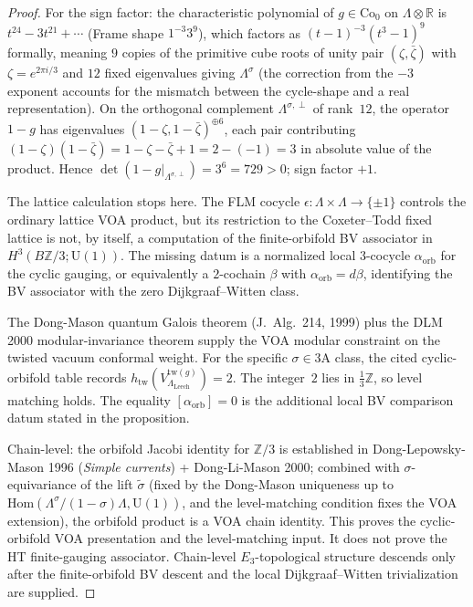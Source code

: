 \begin{proof}
For the sign factor: the characteristic polynomial of
$g \in \mathrm{Co}_0$ on $\Lambda \otimes \mathbb{R}$ is
$t^{24} - 3 t^{21} + \cdots$ (Frame shape $1^{-3} 3^9$), which
factors as $(t - 1)^{-3}(t^3 - 1)^9$ formally, meaning $9$ copies of
the primitive cube roots of unity pair $(\zeta, \bar\zeta)$ with
$\zeta = e^{2\pi i/3}$ and $12$ fixed eigenvalues giving $\Lambda^\sigma$
(the correction from the $-3$ exponent accounts for the mismatch
between the cycle-shape and a real representation). On the orthogonal
complement $\Lambda^{\sigma,\perp}$ of rank~$12$, the operator $1 - g$
has eigenvalues $(1 - \zeta, 1 - \bar\zeta)^{\oplus 6}$, each pair
contributing $(1-\zeta)(1-\bar\zeta) = 1 - \zeta - \bar\zeta + 1
= 2 - (-1) = 3$ in absolute value of the product. Hence
$\det(1 - g|_{\Lambda^{\sigma,\perp}}) = 3^6 = 729 > 0$; sign factor
$+1$.

The lattice calculation stops here.  The FLM cocycle
\(\epsilon\colon \Lambda\times\Lambda\to\{\pm1\}\) controls the
ordinary lattice VOA product, but its restriction to the
Coxeter--Todd fixed lattice is not, by itself, a computation of the
finite-orbifold BV associator in
\(H^3(B\mathbb Z/3;\mathrm U(1))\).  The missing datum is a normalized
local \(3\)-cocycle \(\alpha_{\mathrm{orb}}\) for the cyclic gauging,
or equivalently a \(2\)-cochain \(\beta\) with
\(\alpha_{\mathrm{orb}}=d\beta\), identifying the BV associator with
the zero Dijkgraaf--Witten class.

The Dong-Mason quantum Galois theorem (J.~Alg.~214, 1999) plus the
DLM 2000 modular-invariance theorem supply the VOA modular constraint
on the twisted vacuum conformal weight. For the specific
$\sigma \in 3\mathrm{A}$ class, the cited cyclic-orbifold table records
$h_{\mathrm{tw}}(V_{\Lambda_{\mathrm{Leech}}}^{\mathrm{tw}(g)}) = 2$.
The integer~$2$ lies in $\frac{1}{3}\mathbb{Z}$, so level matching
holds. The equality $[\alpha_{\mathrm{orb}}]=0$ is the additional
local BV comparison datum stated in the proposition.

Chain-level: the orbifold Jacobi identity for $\mathbb{Z}/3$ is
established in Dong-Lepowsky-Mason 1996 (\emph{Simple currents}) +
Dong-Li-Mason 2000; combined with $\sigma$-equivariance of the lift
$\widetilde{\sigma}$ (fixed by the Dong-Mason uniqueness up to
$\mathrm{Hom}(\Lambda^\sigma / (1 - \sigma)\Lambda, \mathrm{U}(1))$,
and the level-matching condition fixes the VOA extension), the
orbifold product is a VOA chain identity.  This proves the
cyclic-orbifold VOA presentation and the level-matching input.  It
does not prove the HT finite-gauging associator.  Chain-level
$E_3$-topological structure descends only after the finite-orbifold BV
descent and the local Dijkgraaf--Witten trivialization are supplied.
\end{proof}

